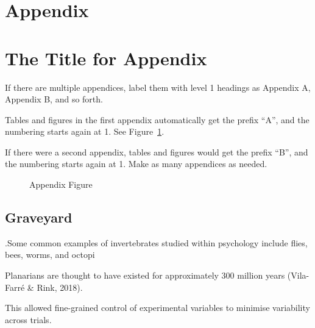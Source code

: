 \documentclass[
  letterpaper,
  DIV=11,
  numbers=noendperiod,
  oneside]{scrartcl}
\begin{document}
\section{Appendix}\label{appendix}

\section{The Title for Appendix}\label{the-title-for-appendix}

If there are multiple appendices, label them with level 1 headings as
Appendix A, Appendix B, and so forth.

Tables and figures in the first appendix automatically get the prefix
``A'', and the numbering starts again at 1. See
Figure~\ref{fig-appendfig}.

If there were a second appendix, tables and figures would get the prefix
``B'', and the numbering starts again at 1. Make as many appendices as
needed.

\begin{figure}


\caption{\label{fig-appendfig}Appendix Figure}

\end{figure}%

\subsection{Graveyard}\label{graveyard}

.Some common examples of invertebrates studied within psychology include
flies, bees, worms, and octopi

Planarians are thought to have existed for approximately 300 million
years (Vila-Farré \& Rink, 2018).

This allowed fine-grained control of experimental variables to minimise
variability across trials.
\end{document}
